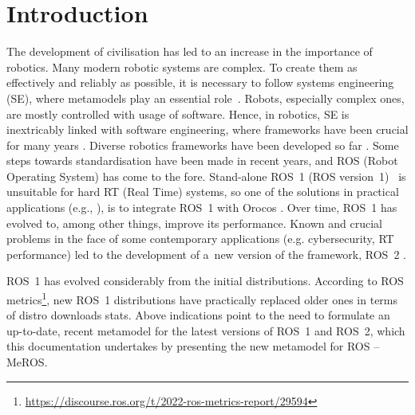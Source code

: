 \documentclass[11pt,oneside,a4paper]{article}
\begin{document}
\section{Introduction}
\label{sec:intro}	
	The development of civilisation has led to an increase in the importance of robotics. Many modern robotic systems are complex. To create them as effectively and reliably as possible, it is necessary to follow systems engineering (SE), where metamodels play an essential role~\cite{bezivin2004search,schmidt2006model,kent2002model}.
	Robots, especially complex ones, are mostly controlled with usage of software. Hence, in robotics, SE is inextricably linked with software engineering, where frameworks have been crucial for many years \cite{mnkandla2009software,shehory2014agent}.
	Diverse robotics frameworks have been developed so far \cite{inigo2012robotics,tsardoulias2017robotic,hentout2016survey}. Some steps towards standardisation have been made in recent years, and ROS (Robot Operating System) has come to the fore. Stand-alone ROS~1 (ROS version~1)~\cite{quigley2009ros} is unsuitable for hard RT (Real Time) systems, so one of the solutions in practical applications (e.g., \cite{lages2014architecture,buys2011haptic,pages2016tiago,Seredynski-fabric-romoco-2019,kornuta-bpan-2020,cholewinski2015software}), is to integrate ROS~1 with Orocos \cite{bruyninckx2001open,bruyninckx2002orocos}. Over time, ROS~1 has evolved to, among other things, improve its performance. Known and crucial problems in the face of some contemporary applications (e.g. cybersecurity, RT performance) led to the development of a~new version of the framework, ROS~2 \cite{maruyama2016exploring,park2020real}.   

	ROS~1 has evolved considerably from the initial distributions. According to ROS metrics\footnote{\url{https://discourse.ros.org/t/2022-ros-metrics-report/29594}}, new ROS~1 distributions have practically replaced older ones in terms of distro downloads stats. Above indications point to the need to formulate an up-to-date, recent metamodel for the latest versions of ROS~1 and ROS~2, which this documentation undertakes by presenting the new metamodel for ROS -- MeROS.
	
\end{document}
